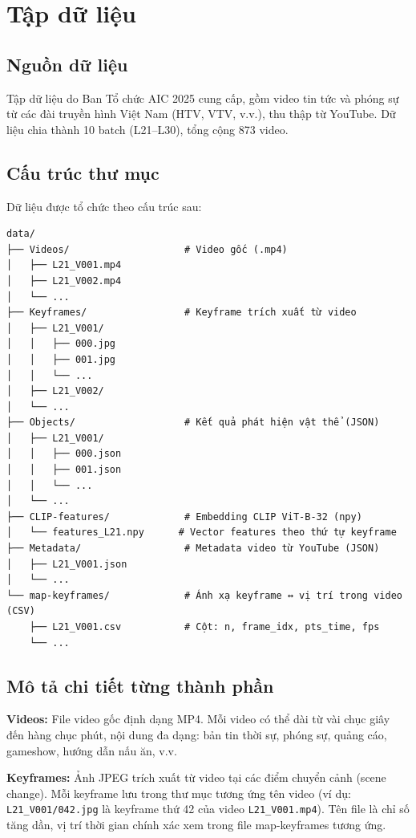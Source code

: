 \documentclass[12pt,a4paper,onecolumn]{article}
\begin{document}
\section{Tập dữ liệu}

\subsection{Nguồn dữ liệu}

Tập dữ liệu do Ban Tổ chức AIC 2025 cung cấp, gồm video tin tức và phóng sự từ các đài truyền hình Việt Nam (HTV, VTV, v.v.), thu thập từ YouTube. Dữ liệu chia thành 10 batch (L21–L30), tổng cộng 873 video.

\subsection{Cấu trúc thư mục}

Dữ liệu được tổ chức theo cấu trúc sau:

\begin{lstlisting}[]
data/
├── Videos/                    # Video gốc (.mp4)
│   ├── L21_V001.mp4
│   ├── L21_V002.mp4
│   └── ...
├── Keyframes/                 # Keyframe trích xuất từ video
│   ├── L21_V001/
│   │   ├── 000.jpg
│   │   ├── 001.jpg
│   │   └── ...
│   ├── L21_V002/
│   └── ...
├── Objects/                   # Kết quả phát hiện vật thể (JSON)
│   ├── L21_V001/
│   │   ├── 000.json
│   │   ├── 001.json
│   │   └── ...
│   └── ...
├── CLIP-features/             # Embedding CLIP ViT-B-32 (npy)
│   └── features_L21.npy      # Vector features theo thứ tự keyframe
├── Metadata/                  # Metadata video từ YouTube (JSON)
│   ├── L21_V001.json
│   └── ...
└── map-keyframes/             # Ánh xạ keyframe ↔ vị trí trong video (CSV)
    ├── L21_V001.csv           # Cột: n, frame_idx, pts_time, fps
    └── ...
\end{lstlisting}


\subsection{Mô tả chi tiết từng thành phần}

\textbf{Videos:} File video gốc định dạng MP4. Mỗi video có thể dài từ vài chục giây đến hàng chục phút, nội dung đa dạng: bản tin thời sự, phóng sự, quảng cáo, gameshow, hướng dẫn nấu ăn, v.v.

\textbf{Keyframes:} Ảnh JPEG trích xuất từ video tại các điểm chuyển cảnh (scene change). Mỗi keyframe lưu trong thư mục tương ứng tên video (ví dụ: \texttt{L21\_V001/042.jpg} là keyframe thứ 42 của video \texttt{L21\_V001.mp4}). Tên file là chỉ số tăng dần, vị trí thời gian chính xác xem trong file map-keyframes tương ứng.
\end{document}
